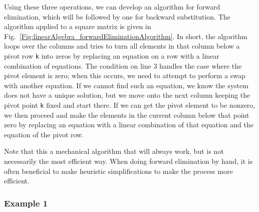 Using these three operations, we can develop an algorithm for forward elimination, which will be followed by one for backward substitution. The algorithm applied to a square matrix is given in Fig.~\ref{Fig:linearAlgebra_forwardEliminationAlgorithm}. In short, the algorithm loops over the columns and tries to turn all elements in that column below a pivot row \texttt{k} into zeros by replacing an equation on a row with a linear combination of equations. The condition on line 3 handles the case where the pivot element is zero; when this occurs, we need to attempt to perform a swap with another equation. If we cannot find such an equation, we know the system does not have a unique solution, but we move onto the next column keeping the pivot point \texttt{k} fixed and start there. If we can get the pivot element to be nonzero, we then proceed and make the elements in the current column below that point zero by replacing an equation with a linear combination of that equation and the equation of the pivot row. 

Note that this a mechanical algorithm that will always work, but is not necessarily the most efficient way. When doing forward elimination by hand, it is often beneficial to make heuristic simplifications to make the process more efficient.

\subsubsection{Example 1} 

